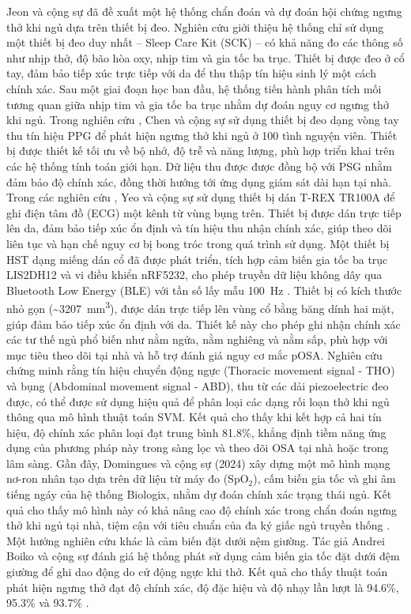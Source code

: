 Jeon và cộng sự \cite{jeon2020realtime} đã đề xuất một hệ thống chẩn đoán và dự
đoán hội chứng ngưng thở khi ngủ dựa trên thiết bị đeo. Nghiên cứu giới thiệu
hệ thống chỉ sử dụng một thiết bị đeo duy nhất – Sleep Care Kit (SCK) – có khả
năng đo các thông số như nhịp thở, độ bão hòa oxy, nhịp tim và gia tốc ba trục.
Thiết bị được đeo ở cổ tay, đảm bảo tiếp xúc trực tiếp với da để thu thập tín
hiệu sinh lý một cách chính xác. Sau một giai đoạn học ban đầu, hệ thống tiến
hành phân tích mối tương quan giữa nhịp tim và gia tốc ba trục nhằm dự đoán
nguy cơ ngưng thở khi ngủ. Trong nghiên cứu \cite{chen2024hdc}, Chen và cộng sự
sử dụng thiết bị đeo dạng vòng tay thu tín hiệu PPG để phát hiện ngưng thở khi
ngủ ở 100 tình nguyện viên. Thiết bị được thiết kế tối ưu về bộ nhớ, độ trễ và
năng lượng, phù hợp triển khai trên các hệ thống tính toán giới hạn. Dữ liệu
thu được được đồng bộ với PSG nhằm đảm bảo độ chính xác, đồng thời hướng tới
ứng dụng giám sát dài hạn tại nhà. Trong các nghiên cứu \cite{yeo2022resnet,
  yeo2022respiratory}, Yeo và cộng sự sử dụng thiết bị dán T-REX TR100A để ghi
điện tâm đồ (ECG) một kênh từ vùng bụng trên. Thiết bị được dán trực tiếp lên
da, đảm bảo tiếp xúc ổn định và tín hiệu thu nhận chính xác, giúp theo dõi liên
tục và hạn chế nguy cơ bị bong tróc trong quá trình sử dụng. Một thiết bị HST
dạng miếng dán cổ đã được phát triển, tích hợp cảm biến gia tốc ba trục
LIS2DH12 và vi điều khiển nRF5232, cho phép truyền dữ liệu không dây qua
Bluetooth Low Energy (BLE) với tần số lấy mẫu 100~Hz
\cite{Sleep_Posture_Detection}. Thiết bị có kích thước nhỏ gọn
(\textasciitilde3207~mm\textsuperscript{3}), được dán trực tiếp lên vùng cổ
bằng băng dính hai mặt, giúp đảm bảo tiếp xúc ổn định với da. Thiết kế này cho
phép ghi nhận chính xác các tư thế ngủ phổ biến như nằm ngửa, nằm nghiêng và
nằm sấp, phù hợp với mục tiêu theo dõi tại nhà và hỗ trợ đánh giá nguy cơ mắc
pOSA. Nghiên cứu\cite{svmHSt2017} chứng minh rằng tín hiệu chuyển động ngực
(Thoracic movement signal - THO) và bụng (Abdominal movement signal - ABD), thu
từ các dải piezoelectric đeo được, có thể được sử dụng hiệu quả để phân loại
các dạng rối loạn thở khi ngủ thông qua mô hình thuật toán SVM. Kết quả cho
thấy khi kết hợp cả hai tín hiệu, độ chính xác phân loại đạt trung bình 81.8\%,
khẳng định tiềm năng ứng dụng của phương pháp này trong sàng lọc và theo dõi
OSA tại nhà hoặc trong lâm sàng. Gần đây, Domingues và cộng sự (2024) xây dựng
một mô hình mạng nơ-ron nhân tạo dựa trên dữ liệu từ máy đo (SpO$_2$), cấm biến
gia tốc và ghi âm tiếng ngáy của hệ thống Biologix, nhằm dự đoán chính xác
trạng thái ngủ. Kết quả cho thấy mô hình này có khả nâng cao độ chính xác trong
chẩn đoán ngưng thở khi ngủ tại nhà, tiệm cận với tiêu chuẩn của đa ký giấc ngủ
truyền thống \cite{domingues2024sleep}. Một hướng nghiên cứu khác là cảm biến
đặt dưới nệm giường. Tác giả Andrei Boiko và cộng sự đánh giá hệ thống phát sử
dụng cảm biến gia tốc đặt dưới đệm giường để ghi dao động do cử động ngực khi
thở. Kết quả cho thấy thuật toán phát hiện ngưng thở đạt độ chính xác, độ đặc
hiệu và độ nhạy lần lượt là 94.6\%, 95.3\% và 93.7\% \cite{Boiko2023}.

